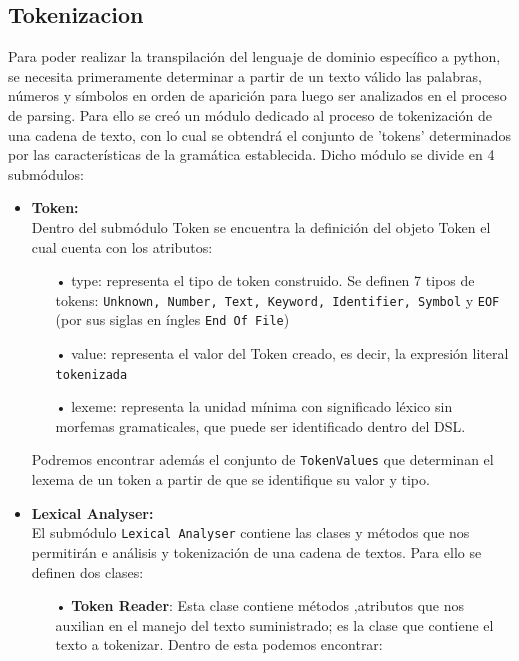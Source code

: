 \documentclass[twoside]{article}
\begin{document}
		\subsection{Tokenizacion}
		Para poder realizar la transpilaci\'on del lenguaje de dominio espec\'ifico a python, se necesita primeramente determinar a partir de un texto v\'alido las palabras, n\'umeros y símbolos en orden de aparici\'on para luego ser analizados en el proceso de parsing. Para ello se cre\'o un m\'odulo dedicado al proceso de tokenizaci\'on de una cadena de texto, con lo cual se obtendr\'a el conjunto de 'tokens' determinados por las caracter\'isticas de la gram\'atica establecida.
		Dicho m\'odulo se divide en 4 subm\'odulos:
		\begin{itemize}
			\item \textbf{Token:}\\
			Dentro del subm\'odulo Token se encuentra la definici\'on del objeto Token el cual cuenta con los atributos:
			
			\begin{itemize}
				\item[•] type: representa el tipo de token construido. Se definen 7 tipos de tokens: \texttt{Unknown, Number, Text, Keyword, Identifier, Symbol} y \texttt{EOF} (por sus siglas en \'ingles \texttt{End Of File})
				\item[•] value: representa el valor del Token creado, es decir, la expresi\'on literal \texttt{tokenizada}
				\item[•] lexeme: representa la unidad m\'inima con significado l\'exico sin morfemas gramaticales, que puede ser identificado dentro del DSL.
			\end{itemize}
			Podremos encontrar adem\'as el conjunto de \texttt{TokenValues} que determinan el lexema de un token a partir de que se identifique su valor y tipo.
			
			\item \textbf{Lexical Analyser:}\\
			El subm\'odulo \texttt{Lexical Analyser} contiene las clases y m\'etodos que nos permitir\'an e an\'alisis y tokenizaci\'on de una cadena de textos. Para ello se definen dos clases:
			\begin{itemize}
				\item[•] \textbf{Token Reader}:
				Esta clase contiene m\'etodos ,atributos que nos auxilian en el manejo del texto suministrado; es la clase que contiene el texto a tokenizar. Dentro de esta podemos encontrar:
				\begin{itemize}
					

\end{itemize}
\end{itemize}
\end{itemize}
\end{document}
